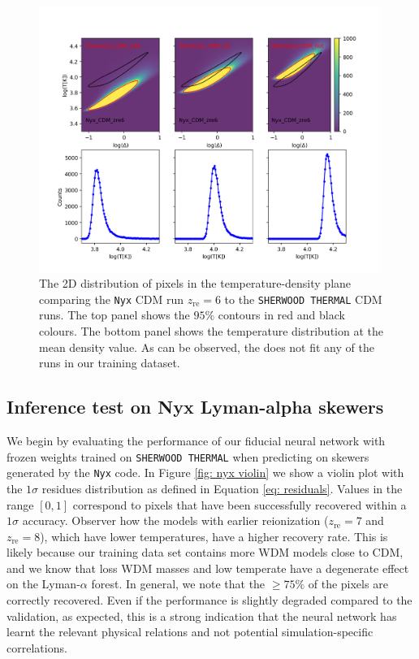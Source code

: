 \begin{figure}
    \centering
    \includegraphics[width=0.99\textwidth,trim={5cm 0 3cm 4cm},clip]{img/ML/TD_plane_nyx_sher.png}
    \caption{The 2D distribution of pixels in the temperature-density plane comparing the \texttt{Nyx} CDM run $z_\mathrm{re}=6$ to the \texttt{SHERWOOD THERMAL} CDM runs. The top panel shows the $95\%$ contours in red and black colours. The bottom panel shows the temperature distribution at the mean density value. As can be observed, the  does not fit any of the runs in our training dataset.}
    \label{fig: nyx TD}
\end{figure}

\subsection{Inference test on Nyx Lyman-alpha skewers}
We begin by evaluating the performance of our fiducial neural network with frozen weights trained on \texttt{SHERWOOD THERMAL} when predicting on skewers generated by the \texttt{Nyx} code. In Figure \ref{fig: nyx violin} we show a violin plot with the $1\sigma$ residues distribution as defined in Equation \ref{eq: residuals}. Values in the range $[0,1]$ correspond to pixels that have been successfully recovered within a $1\sigma$ accuracy. Observer how the models with earlier reionization ($z_\mathrm{re}=7$ and $z_\mathrm{re}=8$), which have lower temperatures, have a higher recovery rate. This is likely because our training data set contains more WDM models close to CDM, and we know that loss WDM masses and low temperate have a degenerate effect on the Lyman-$\alpha$ forest. In general, we note that the $\geq 75 \%$ of the pixels are correctly recovered. Even if the performance is slightly degraded compared to the  validation, as expected, this is a strong indication that the neural network has learnt the relevant physical relations and not potential simulation-specific correlations.

